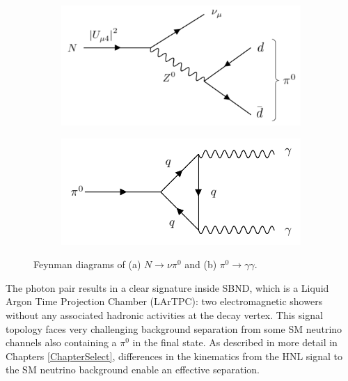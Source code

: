 \begin{figure}[htbp!]
\begin{subfigure}[h]{0.49\linewidth}
\centering    
\includegraphics[width=\linewidth]{N_to_pi0_edit}
\caption{}
\label{fig:HNLdecaydiagram}
\end{subfigure}
\hfill
\begin{subfigure}[h]{0.49\linewidth}
\centering    
\includegraphics[width=\linewidth]{pi0_to_gam}
\caption{}
\label{fig:pi0decaydiagram}
\end{subfigure}%
\caption[Heavy Neutral Lepton and Neutral Pion Decay Feynman Diagrams]{
Feynman diagrams of (a) $N \rightarrow \nu \pi^0$ and (b) $\pi^0 \rightarrow \gamma\gamma$.
}
\end{figure}

The photon pair results in a clear signature inside SBND, which is a Liquid Argon Time Projection Chamber (LArTPC): two electromagnetic showers without any associated hadronic activities at the decay vertex.
This signal topology faces very challenging background separation from some SM neutrino channels also containing a $\pi^0$ in the final state.
As described in more detail in Chapters \ref{ChapterSelect}, differences in the kinematics from the HNL signal to the SM neutrino background enable an effective separation.

